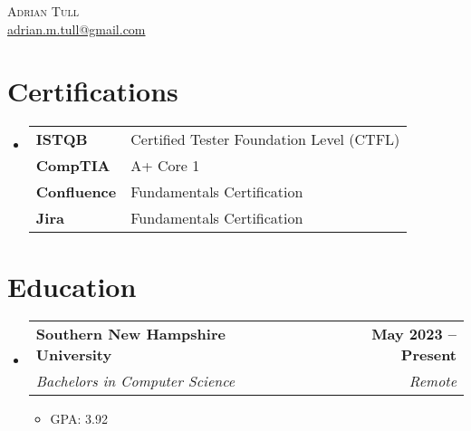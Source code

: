 \documentclass[letterpaper,11pt]{article}
\makeatletter
\newcommand{\resumeItem}[1]{
  \item\small{
    {#1 \vspace{-2pt}}
  }
}
\newcommand{\resumeSubheading}[4]{
  \vspace{-2pt}\item
    \begin{tabular*}{1.0\textwidth}[t]{l@{\extracolsep{\fill}}r}
      \textbf{#1} & \textbf{\small #2} \\
      \textit{\small #3} & \textit{\small #4} \\
    \end{tabular*}\vspace{-7pt}
}
\newcommand{\resumeSubHeadingListStart}{\begin{itemize}[leftmargin=0in, label={}]}
\newcommand{\resumeSubHeadingListEnd}{\end{itemize}}
\newcommand{\resumeItemListStart}{\begin{itemize}}
\newcommand{\resumeItemListEnd}{\end{itemize}\vspace{-5pt}}
\makeatother
\begin{document}
\begin{center}
    {\Huge \scshape Adrian Tull} \\ \vspace{2pt}
    \href{mailto:adrian.m.tull@gmail.com}{adrian.m.tull@gmail.com}
\end{center}

\section{Certifications}
\resumeSubHeadingListStart
    \item
    \begin{tabular}{p{3cm} p{10cm}}
    \textbf{ISTQB}      & Certified Tester Foundation Level (CTFL) \\
    \textbf{CompTIA}    & A+ Core 1                              \\
    \textbf{Confluence} & Fundamentals Certification               \\
    \textbf{Jira}       & Fundamentals Certification               \\
    \end{tabular}
\resumeSubHeadingListEnd


\section{Education}
\resumeSubHeadingListStart
    \resumeSubheading
      {Southern New Hampshire University}{May 2023 -- Present}
      {Bachelors in Computer Science}{Remote}
    \resumeItemListStart
        \resumeItem{GPA: 3.92}
    \resumeItemListEnd
\resumeSubHeadingListEnd

\end{document}
